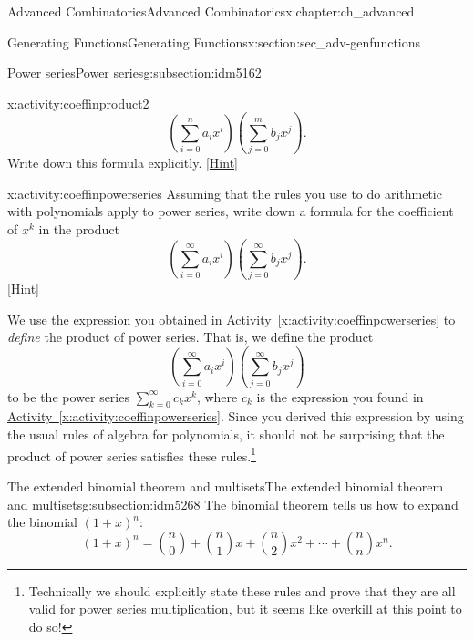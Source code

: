 \documentclass[oneside,10pt,]{book}
\numberwithin{equation}{chapter}
\begin{document}
\begin{chapterptx}{Advanced Combinatorics}{}{Advanced Combinatorics}{}{}{x:chapter:ch_advanced}
\begin{sectionptx}{Generating Functions}{}{Generating Functions}{}{}{x:section:sec_adv-genfunctions}
\begin{subsectionptx}{Power series}{}{Power series}{}{}{g:subsection:idm5162}
\begin{activity}{}{x:activity:coeffinproduct2}
\begin{equation*}
\left(\sum_{i=0}^n a_ix^i\right)\left(\sum_{j=0}^m b_jx^j\right).
\end{equation*}
Write down this formula explicitly.%
\space\hspace*{0pt}\hfill{\tiny\hyperlink{g:hint:idm5238-back}{[Hint]}}\end{activity}
\begin{activity}{}{x:activity:coeffinpowerseries}%
Assuming that the rules you use to do arithmetic with polynomials apply to power series, write down a formula for the coefficient of \(x^k\) in the product%
\begin{equation*}
\left(\sum_{i=0}^\infty a_ix^i\right)\left(\sum_{j=0}^\infty
b_jx^j\right)\text{.}
\end{equation*}
%
\space\hspace*{0pt}\hfill{\tiny\hyperlink{g:hint:idm5253-back}{[Hint]}}\end{activity}
We use the expression you obtained in \hyperref[x:activity:coeffinpowerseries]{Activity~\ref{x:activity:coeffinpowerseries}} to \emph{define} the product of power series. That is, we define the product%
\begin{equation*}
\left(\sum_{i=0}^\infty a_ix^i\right)\left(\sum_{j=0}^\infty
b_jx^j\right)
\end{equation*}
to be the power series \(\sum_{k=0}^\infty c_k x^k\), where \(c_k\) is the expression you found in \hyperref[x:activity:coeffinpowerseries]{Activity~\ref{x:activity:coeffinpowerseries}}. Since you derived this expression by using the usual rules of algebra for polynomials, it should not be surprising that the product of power series satisfies these rules.\footnote{Technically we should explicitly state these rules and prove that they are all valid for power series multiplication, but it seems like overkill at this point to do so!\label{g:fn:idm5267}}%
\end{subsectionptx}
%
%
\typeout{************************************************}
\typeout{************************************************}
%
\begin{subsectionptx}{The extended binomial theorem and multisets}{}{The extended binomial theorem and multisets}{}{}{g:subsection:idm5268}
The binomial theorem tells us how to expand the binomial \((1+x)^n\):%
\begin{equation*}
(1+x)^n = \binom{n}{0} + \binom{n}{1}x + \binom{n}{2}x^2 + \cdots + \binom{n}{n}x^n\text{.}
\end{equation*}

\end{subsectionptx}
\end{sectionptx}
\end{chapterptx}
\end{document}
